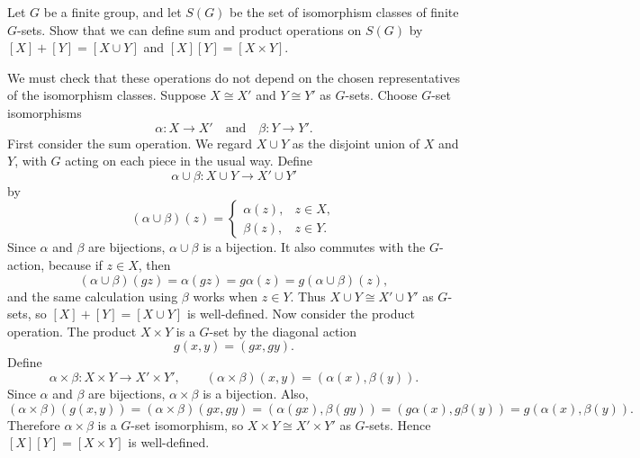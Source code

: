 \documentclass[../Odyssey_Project.tex]{subfiles}
\begin{document}
\begin{exercise}
\label{ex:3.11}
Let $G$ be a finite group, and let $S(G)$ be the set of isomorphism classes of finite $G$-sets. Show that we can define sum and product operations on $S(G)$ by $[X] + [Y] = [X \cup Y]$ and $[X][Y] = [X \times Y]$.
\end{exercise}
\begin{solution}
    We must check that these operations do not depend on the chosen representatives of the isomorphism classes.
    Suppose $X \cong X'$ and $Y \cong Y'$ as $G$-sets. Choose $G$-set isomorphisms
    \[
        \alpha \colon X \to X'
        \quad\text{and}\quad
        \beta \colon Y \to Y'.
    \]
    First consider the sum operation. We regard $X \cup Y$ as the disjoint union of $X$ and $Y$, with $G$ acting on each piece in the usual way. Define
    \[
        \alpha \cup \beta \colon X \cup Y \to X' \cup Y'
    \]
    by
    \[
        (\alpha \cup \beta)(z)
        =
        \begin{cases}
            \alpha(z), & z \in X,\\
            \beta(z),  & z \in Y.
        \end{cases}
    \]
    Since $\alpha$ and $\beta$ are bijections, $\alpha \cup \beta$ is a bijection. It also commutes with the $G$-action, because if $z \in X$, then
    \[
        (\alpha \cup \beta)(gz)=\alpha(gz)=g\alpha(z)=g(\alpha \cup \beta)(z),
    \]
    and the same calculation using $\beta$ works when $z \in Y$. Thus $X \cup Y \cong X' \cup Y'$ as $G$-sets, so $[X]+[Y]=[X \cup Y]$ is well-defined.
    Now consider the product operation. The product $X \times Y$ is a $G$-set by the diagonal action
    \[
        g(x,y)=(gx,gy).
    \]
    Define
    \[
        \alpha \times \beta \colon X \times Y \to X' \times Y',
        \qquad
        (\alpha \times \beta)(x,y)=(\alpha(x),\beta(y)).
    \]
    Since $\alpha$ and $\beta$ are bijections, $\alpha \times \beta$ is a bijection. Also,
    \[
        (\alpha \times \beta)(g(x,y))
        =
        (\alpha \times \beta)(gx,gy)
        =
        (\alpha(gx),\beta(gy))
        =
        (g\alpha(x),g\beta(y))
        =
        g(\alpha(x),\beta(y)).
    \]
    Therefore $\alpha \times \beta$ is a $G$-set isomorphism, so $X \times Y \cong X' \times Y'$ as $G$-sets. Hence $[X][Y]=[X \times Y]$ is well-defined.
\end{solution}
\end{document}
